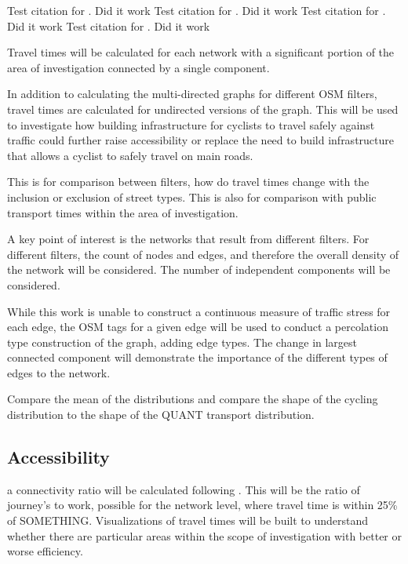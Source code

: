 Test citation for \cite{osmnx}. Did it work
Test citation for \cite{networkx}. Did it work
Test citation for \cite{qgis}. Did it work
Test citation for \cite{python}. Did it work

Travel times will be calculated for each network with a significant portion of the area of investigation connected by a single component.

In addition to calculating the multi-directed graphs for different OSM filters, travel times are calculated for undirected versions of the graph. This will be used to investigate how building infrastructure for cyclists to travel safely against traffic could further raise accessibility or replace the need to build infrastructure that allows a cyclist to safely travel on main roads. 

 This is for comparison between filters, how do travel times change with the inclusion or exclusion of street types. This is also for comparison with public transport times within the area of investigation. 

A key point of interest is the networks that result from different filters. For different filters, the count of nodes and edges, and therefore the overall density of the network will be considered. The number of independent components will be considered. 

While this work is unable to construct a continuous measure of traffic stress for each edge, the OSM tags for a given edge will be used to conduct a percolation type construction of the graph, adding edge types. The change in largest connected component will demonstrate the importance of the different types of edges to the network. 

Compare the mean of the distributions and compare the shape of the cycling distribution to the shape of the QUANT transport distribution. 


\subsection{Accessibility}

a connectivity ratio will be calculated following \cite{furth2016network}. This will be the ratio of journey's to work, possible for the network level, where travel time is within 25\% of SOMETHING. Visualizations of travel times will be built to understand whether there are particular areas within the scope of investigation with better or worse efficiency. 
